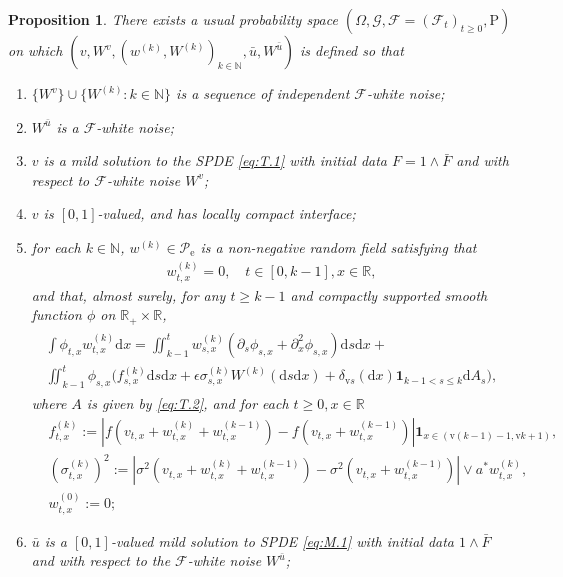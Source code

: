 \documentclass[12pt,a4paper]{amsart}
\numberwithin{equation}{section}
\theoremstyle{plain}
\newtheorem{proposition}[theorem]{Proposition}
\theoremstyle{remark}
\begin{document}
\begin{proposition}\label{thm:T.2}
	There exists a usual probability space $(\Omega, \mathcal G, \mathcal F = (\mathcal F_t)_{t\geq 0}, \mathrm P)$ on which $(v, W^v, (w^{(k)}, W^{(k)})_{k\in \mathbb N}, \bar u,W^{\bar u})$ is defined so that 
\begin{enumerate}
\item 
	$\{W^v\} \cup \{W^{(k)}: k \in \mathbb N\}$ is a sequence of independent $\mathcal F$-white noise;
\item 
	$W^{\bar u}$ is a $\mathcal F$-white noise;
\item 
	$v$ is a mild solution to the SPDE \eqref{eq:T.1} with initial data $F=1\wedge \bar F$ and with respect to $\mathcal F$-white noise $W^v$; 
\item 
	$v$ is $[0,1]$-valued, and has locally compact interface;
\item 
	for each $k\in \mathbb N$, $w^{(k)}\in \mathscr P_\mathrm e$ is a non-negative random field satisfying that 
\begin{align}
	w^{(k)}_{t,x} = 0, \quad t\in [0,k-1], x\in \mathbb R,
\end{align}	
	and that, almost surely, for any $t\geq k-1$ and compactly supported smooth function $\phi$ on $\mathbb R_+ \times \mathbb R$,
\begin{align} 
\begin{multlined}
\int \phi_{t,x}w^{(k)}_{t,x} \mathrm dx = \iint_{k-1}^t w^{(k)}_{s,x}(\partial_s \phi_{s,x} + \partial_x^2 \phi_{s,x}) \mathrm ds\mathrm dx + {}
\\ \iint_{k-1}^t \phi_{s,x} \big(f^{(k)}_{s,x}\mathrm ds\mathrm dx + \epsilon \sigma^{(k)}_{s,x}W^{(k)}(\mathrm ds\mathrm dx) + \delta_{\mathrm vs}(\mathrm dx) \mathbf 1_{k-1<s\leq k} \mathrm d A_s\big),
\end{multlined}
\end{align}
	where $A$ is given by \eqref{eq:T.2}, and for each $t\geq 0, x\in \mathbb R$
\begin{align} 
	&  f_{t,x}^{(k)} 
	:= |f(v_{t,x}+ w_{t,x}^{(k)} + w_{t,x}^{(k-1)}) - f(v_{t,x}+ w_{t,x}^{(k-1)})| \mathbf 1_{x\in (\mathrm v(k-1) - 1, \mathrm vk  + 1)}, 
	\\ & (\sigma_{t,x}^{(k)})^2 
	:= |\sigma^2(v_{t,x} + w^{(k)}_{t,x} + w^{(k-1)}_{t,x}) - \sigma^2 (v_{t,x} + w^{(k-1)}_{t,x})| \vee a^* w^{(k)}_{t,x},
	\\&w^{(0)}_{t,x}
	:= 0;
\end{align}
	\item $\bar u$ is a $[0,1]$-valued mild solution to SPDE \eqref{eq:M.1} with initial data $1\wedge \bar F$ and with respect to the $\mathcal F$-white noise $W^{\bar u}$;

\end{enumerate}
\end{proposition}
\end{document}
